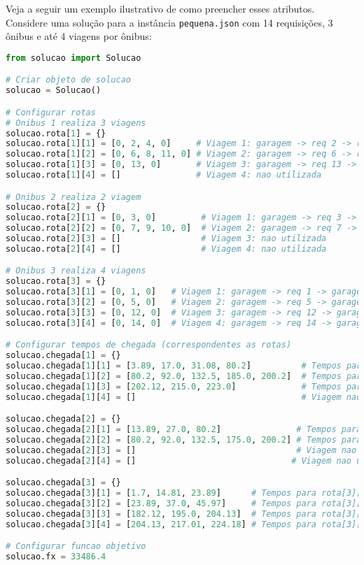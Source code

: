 \documentclass[12pt,a4paper]{article}
\begin{document}
Veja a seguir um exemplo ilustrativo de como preencher esses atributos. Considere uma solução para a instância \texttt{pequena.json} com 14 requisições, 3 ônibus e até 4 viagens por ônibus:

\begin{lstlisting}[language=Python]
from solucao import Solucao

# Criar objeto de solucao
solucao = Solucao()

# Configurar rotas
# Onibus 1 realiza 3 viagens
solucao.rota[1] = {}
solucao.rota[1][1] = [0, 2, 4, 0]     # Viagem 1: garagem -> req 2 -> req 4 -> garagem
solucao.rota[1][2] = [0, 6, 8, 11, 0] # Viagem 2: garagem -> req 6 -> req 8 -> req 11 -> garagem
solucao.rota[1][3] = [0, 13, 0]       # Viagem 3: garagem -> req 13 -> garagem
solucao.rota[1][4] = []               # Viagem 4: nao utilizada

# Onibus 2 realiza 2 viagem
solucao.rota[2] = {}
solucao.rota[2][1] = [0, 3, 0]         # Viagem 1: garagem -> req 3 -> garagem
solucao.rota[2][2] = [0, 7, 9, 10, 0]  # Viagem 2: garagem -> req 7 -> req 9 -> req 10 -> garagem
solucao.rota[2][3] = []                # Viagem 3: nao utilizada
solucao.rota[2][4] = []                # Viagem 4: nao utilizada

# Onibus 3 realiza 4 viagens
solucao.rota[3] = {}
solucao.rota[3][1] = [0, 1, 0]   # Viagem 1: garagem -> req 1 -> garagem
solucao.rota[3][2] = [0, 5, 0]   # Viagem 2: garagem -> req 5 -> garagem
solucao.rota[3][3] = [0, 12, 0]  # Viagem 3: garagem -> req 12 -> garagem
solucao.rota[3][4] = [0, 14, 0]  # Viagem 4: garagem -> req 14 -> garagem

# Configurar tempos de chegada (correspondentes as rotas)
solucao.chegada[1] = {}
solucao.chegada[1][1] = [3.89, 17.0, 31.08, 80.2]          # Tempos para rota[1][1]
solucao.chegada[1][2] = [80.2, 92.0, 132.5, 185.0, 200.2]  # Tempos para rota[1][2]
solucao.chegada[1][3] = [202.12, 215.0, 223.0]             # Tempos para rota[1][3]
solucao.chegada[1][4] = []                                 # Viagem nao utilizada

solucao.chegada[2] = {}
solucao.chegada[2][1] = [13.89, 27.0, 80.2]               # Tempos para rota[2][1]
solucao.chegada[2][2] = [80.2, 92.0, 132.5, 175.0, 200.2] # Tempos para rota[2][2]
solucao.chegada[2][3] = []                                # Viagem nao utilizada
solucao.chegada[2][4] = []                               # Viagem nao utilizada

solucao.chegada[3] = {}
solucao.chegada[3][1] = [1.7, 14.81, 23.89]      # Tempos para rota[3][1]
solucao.chegada[3][2] = [23.89, 37.0, 45.97]     # Tempos para rota[3][2]
solucao.chegada[3][3] = [182.12, 195.0, 204.13]  # Tempos para rota[3][3]
solucao.chegada[3][4] = [204.13, 217.01, 224.18] # Tempos para rota[3][4]

# Configurar funcao objetivo
solucao.fx = 33486.4
\end{lstlisting}
\end{document}
